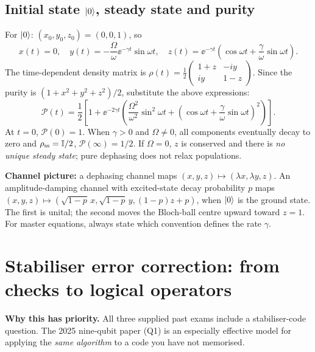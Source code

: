 \subsection{Initial state $\left\lvert 0\right\rangle$, steady state and purity}
For $\left\lvert 0\right\rangle$: $(x_0,y_0,z_0)=(0,0,1)$, so
\begin{equation}\label{eq:ket0sol}
\boxed{x(t)=0,\quad y(t)=-\frac\Omega\omega\ee^{-\gamma t}\sin\omega t,\quad
z(t)=\ee^{-\gamma t}\!\left(\cos\omega t+\frac\gamma\omega\sin\omega t\right).}
\end{equation}
The time-dependent density matrix is $\rho(t)=\frac12\left(\begin{smallmatrix}1+z&-iy\\iy&1-z\end{smallmatrix}\right)$. Since the purity is $(1+x^2+y^2+z^2)/2$, substitute the above expressions:
\begin{equation}
\boxed{\mathcal P(t)=\frac12\!\left[1+\ee^{-2\gamma t}\!\left(\frac{\Omega^2}{\omega^2}\sin^2\omega t+
\left(\cos\omega t+\frac\gamma\omega\sin\omega t\right)^2\right)\right].}
\end{equation}
At $t=0$, $\mathcal P(0)=1$. When $\gamma>0$ and $\Omega\ne0$, all components eventually decay to zero and $\rho_{\rm ss}=\mathbb{I}/2$, $\mathcal P(\infty)=1/2$. If $\Omega=0$, $z$ is conserved and there is \emph{no unique steady state}; pure dephasing does not relax populations.

\begin{examtip}
\textbf{Channel picture:} a dephasing channel maps $(x,y,z)\mapsto(\lambda x,\lambda y,z)$. An amplitude-damping channel with excited-state decay probability $p$ maps $(x,y,z)\mapsto(\sqrt{1-p}\,x,\sqrt{1-p}\,y,(1-p)z+p)$, when $\left\lvert 0\right\rangle$ is the ground state. The first is unital; the second moves the Bloch-ball centre upward toward $z=1$. For master equations, always state which convention defines the rate $\gamma$.
\end{examtip}

\section{Stabiliser error correction: from checks to logical operators}\label{sec:qecsol}
\textbf{Why this has priority.} All three supplied past exams include a stabiliser-code question. The 2025 nine-qubit paper (Q1) is an especially effective model for applying the \emph{same algorithm} to a code you have not memorised.


